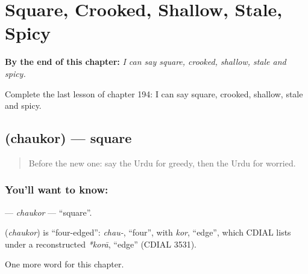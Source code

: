 
\chapter{Square, Crooked, Shallow, Stale, Spicy}
\label{ch:ur-square-crooked-shallow-stale-spicy}

\begin{chapteropening}
\textbf{By the end of this chapter:} \emph{I can say square, crooked, shallow, stale and spicy.}

Complete the last lesson of chapter 194: I can say square, crooked, shallow, stale and spicy.
\end{chapteropening}

\section[\texorpdfstring{\ur{چوکور} (chaukor)}{چوکور (chaukor)}]{ (chaukor) — square}

\label{lesson:UR-C194-chaukor}



\begin{quote}
Before the new one: say the Urdu for greedy, then the Urdu for worried.
\end{quote}

\subsection*{You'll want to know: }
\textbf{} — \emph{chaukor} — \textquotedblleft{}square\textquotedblright{}.

\begin{cousinweb}
\textbf{} (\emph{chaukor}) is \textquotedblleft{}four-edged\textquotedblright{}: \emph{chau-}, \textquotedblleft{}four\textquotedblright{}, with \emph{kor}, \textquotedblleft{}edge\textquotedblright{}, which CDIAL lists under a reconstructed \emph{*korā}, \textquotedblleft{}edge\textquotedblright{} (CDIAL 3531).
\end{cousinweb}

\begin{grammarlens}[title={What you've built}]
One more word for this chapter.
\end{grammarlens}

